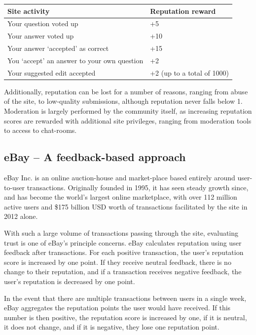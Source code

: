 \documentclass[]{final_report}
\begin{document}
\begin{minipage}{\linewidth}
\centering
\begin{tabular}{|l|l|}
\hline \textbf{Site activity} & \textbf{Reputation reward} \\ 
\hline Your question voted up & +5 \\ 
\hline Your answer voted up & +10 \\ 
\hline Your answer `accepted' as correct & +15 \\ 
\hline You `accept' an answer to your own question & +2 \\ 
\hline Your suggested edit accepted & +2 (up to a total of 1000) \\ 
\hline 
\end{tabular}\par
{} \label{tab:title}
\end{minipage}


Additionally, reputation can be lost for a number of reasons, ranging from abuse of the site, to low-quality submissions, although reputation never falls below 1. Moderation is largely performed by the community itself, as increasing reputation scores are rewarded with additional site privileges, ranging from moderation tools to access to chat-rooms.


\subsection{eBay -- A feedback-based approach}

eBay Inc. is an online auction-house and market-place based entirely around user-to-user transactions. Originally founded in 1995, it has seen steady growth since, and has become the world's largest online marketplace, with over 112 million active users and \$175 billion USD worth of transactions facilitated by the site in 2012 alone.

With such a large volume of transactions passing through the site, evaluating trust is one of eBay's principle concerns. eBay calculates reputation using user feedback after transactions. For each positive transaction, the user's reputation score is increased by one point. If they receive neutral feedback, there is no change to their reputation, and if a transaction receives negative feedback, the user's reputation is decreased by one point.

In the event that there are multiple transactions between users in a single week, eBay aggregates the reputation points the user would have received. If this number is then positive, the reputation score is increased by one, if it is neutral, it does not change, and if it is negative, they lose one reputation point.
\end{document}
